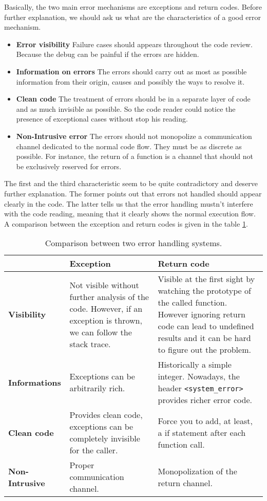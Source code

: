 \documentclass[a4paper,10pt]{article}
\newcommand{\cpp}[1]{\lstinline{#1}}
\begin{document}
Basically, the two main error mechanisms are exceptions and return codes. Before further explanation, we should ask us what are the characteristics of a good error mechanism.

\begin{itemize}
 \item \textbf{Error visibility} Failure cases should appears throughout the code review. Because the debug can be painful if the errors are hidden.
 \item \textbf{Information on errors} The errors should carry out as most as possible information from their origin, causes and possibly the ways to resolve it.
 \item \textbf{Clean code} The treatment of errors should be in a separate layer of code and as much invisible as possible. So the code reader could notice the presence of exceptional cases without stop his reading.
 \item \textbf{Non-Intrusive error} The errors should not monopolize a communication channel dedicated to the normal code flow. They must be as discrete as possible. For instance, the return of a function is a channel that should not be exclusively reserved for errors.
\end{itemize}

The first and the third characteristic seem to be quite contradictory and deserve further explanation. The former points out that errors not handled should appear clearly in the code. The latter tells us that the error handling mustn't interfere with the code reading, meaning that it clearly shows the normal execution flow. A comparison between the exception and return codes is given in the table \ref{comp-handling-error}.

\begin{table}[h!]
\centering
\bgroup
\def\arraystretch{1.5}
\begin{tabular}{|l|>{\raggedright\arraybackslash}p{5cm}|>{\raggedright\arraybackslash}p{5cm}|}
\hline
                    & \textbf{Exception} & \textbf{Return code} \\
\hline
\textbf{Visibility} & Not visible without further analysis of the code. However, if an exception is thrown, we can follow the stack trace. & Visible at the first sight by watching the prototype of the called function. However ignoring return code can lead to undefined results and it can be hard to figure out the problem. \\
\hline
\textbf{Informations} & Exceptions can be arbitrarily rich. & Historically a simple integer. Nowadays, the header \cpp{<system_error>} provides richer error code. \\
\hline
\textbf{Clean code} & Provides clean code, exceptions can be completely invisible for the caller. & Force you to add, at least, a if statement after each function call. \\
\hline
\textbf{Non-Intrusive} & Proper communication channel. & Monopolization of the return channel. \\
\hline
\end{tabular}
\egroup
\caption{Comparison between two error handling systems.}
\label{comp-handling-error}
\end{table}
\end{document}
